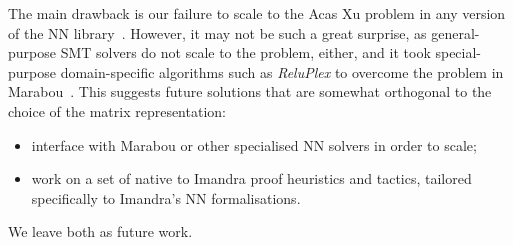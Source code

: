 \documentclass[runningheads]{llncs}
\begin{document}
The main drawback is our failure to scale to the Acas Xu problem in any version of the NN library~\cite{DPKD22}. However, it may not be such a great surprise, as general-purpose SMT solvers do not scale to the problem, either, and it took special-purpose domain-specific algorithms such as \emph{ReluPlex} to overcome the problem  in Marabou~\cite{}.
This suggests future solutions that are somewhat orthogonal to the choice of the matrix representation:
\begin{itemize}
  \item interface with Marabou or other specialised NN solvers in order to scale;
\item work on a set of native to Imandra proof heuristics and tactics, tailored specifically to Imandra's NN formalisations.
\end{itemize}

We leave both as future work. 



%
%


\end{document}
